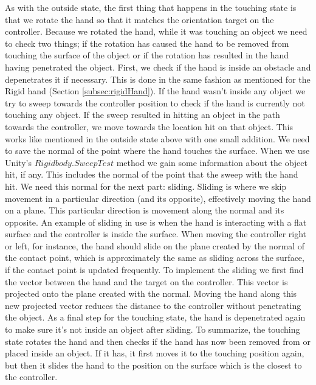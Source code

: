 As with the outside state, the first thing that happens in the touching state is that we rotate the hand so that it matches the orientation target on the controller. Because we rotated the hand, while it was touching an object we need to check two things; if the rotation has caused the hand to be removed from touching the surface of the object or if the rotation has resulted in the hand having penetrated the object. First, we check if the hand is inside an obstacle and depenetrates it if necessary. This is done in the same fashion as mentioned for the Rigid hand (Section \ref{subsec:rigidHand}). If the hand wasn't inside any object we try to sweep towards the controller position to check if the hand is currently not touching any object. If the sweep resulted in hitting an object in the path towards the controller, we move towards the location hit on that object. This works like mentioned in the outside state above with one small addition. We need to save the normal of the point where the hand touches the surface. When we use Unity's $Rigidbody.SweepTest$ method we gain some information about the object hit, if any. This includes the normal of the point that the sweep with the hand hit. We need this normal for the next part: sliding. Sliding is where we skip movement in a particular direction (and its opposite), effectively moving the hand on a plane. This particular direction is movement along the normal and its opposite. An example of sliding in use is when the hand is interacting with a flat surface and the controller is inside the surface. When moving the controller right or left, for instance, the hand should slide on the plane created by the normal of the contact point, which is approximately the same as sliding across the surface, if the contact point is updated frequently. To implement the sliding we first find the vector between the hand and the target on the controller. This vector is projected onto the plane created with the normal. Moving the hand along this new projected vector reduces the distance to the controller without penetrating the object. As a final step for the touching state, the hand is depenetrated again to make sure it's not inside an object after sliding. To summarize, the touching state rotates the hand and then checks if the hand has now been removed from or placed inside an object. If it has, it first moves it to the touching position again, but then it slides the hand to the position on the surface which is the closest to the controller.

